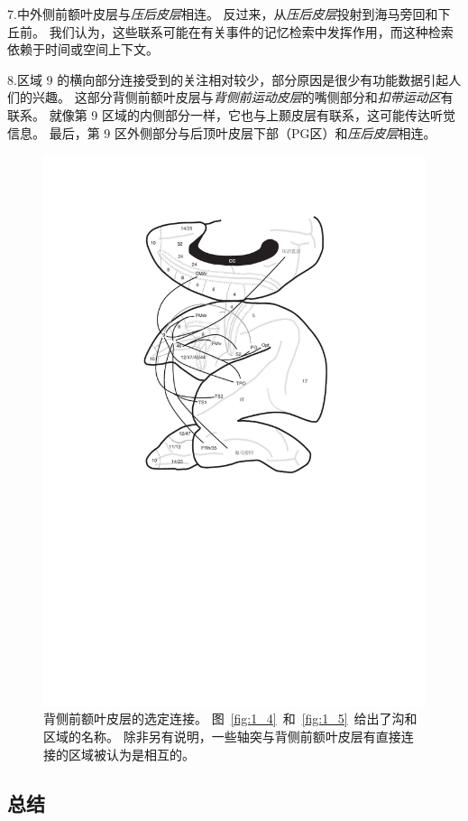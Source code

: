 7.中外侧前额叶皮层与\textit{压后皮层}相连\cite{morris1999fiber}。
反过来，从\textit{压后皮层}投射到海马旁回和下丘前\cite{kobayashi2007macaque}。
我们认为，这些联系可能在有关事件的记忆检索中发挥作用，而这种检索依赖于时间或空间上下文\cite{vann2009does}。
\par


8.区域 9 的横向部分连接受到的关注相对较少，部分原因是很少有功能数据引起人们的兴趣。
这部分背侧前额叶皮层与\textit{背侧前运动皮层}的嘴侧部分\cite{petrides1999dorsolateral}和\textit{扣带运动区}\cite{morecraft1993frontal}有联系。
就像第 9 区域的内侧部分一样，它也与上颞皮层有联系，这可能传达听觉信息\cite{petrides1984projections,saleem2008complementary}。
最后，第 9 区外侧部分与后顶叶皮层下部（PG区）\cite{cavada1989posterior}和\textit{压后皮层}\cite{kobayashi2003macaque}相连。


\begin{figure}
	\centering
	\includegraphics[width=0.7\linewidth]{chap6/6_2}
	\caption{背侧前额叶皮层的选定连接。
		图~\ref{fig:1_4}~和~\ref{fig:1_5}~给出了沟和区域的名称。
		除非另有说明，一些轴突与背侧前额叶皮层有直接连接的区域被认为是相互的。}
	\label{fig:6_2}
\end{figure}



\subsection{总结}

